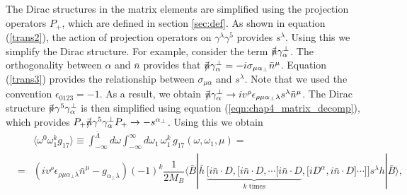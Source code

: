 The Dirac structures in the matrix elements are simplified using the projection operators $P_{+}$, which are defined in section \ref{sec:def}. As shown in equation (\ref{trans2}), the action of projection operators on $\gamma^{\lambda}\gamma^5$ provides $s^{\lambda}$. Using this we simplify the Dirac structure. For example, consider the term $\slashed{\bar{n}}\gamma_{\alpha}^{\perp}$. The orthogonality between $\alpha$ and $\bar{n}$ provides that $\nbslash\gamma_\alpha^\perp=-i\sigma_{\mu\alpha_\perp}\bar n^\mu$. Equation (\ref{trans3}) provides the relationship between $\sigma_{\mu\alpha}$ and $s^{\lambda}$. Note that we used the convention $\epsilon_{0123}=-1$. As a result, we obtain $\nbslash\gamma_\alpha^\perp\to iv^\rho\epsilon_{\rho\mu\alpha_\perp\lambda}s^\lambda\bar n^\mu$. The Dirac structure $\nbslash\gamma^5\gamma_\alpha^\perp$ is then simplified using equation (\ref{eqn:chap4_matrix_decomp}), which provides $P_+\nbslash\gamma^5\gamma_\alpha^\perp P_+\to-s^{\alpha_\perp}$. Using this we obtain
\begin{eqnarray}\label{eqn:chap5_mom_g17_omega_1}
&&\langle\omega^0\omega_1^kg_{17}\rangle\equiv\int^{\bar \Lambda}_{-\infty}d\omega\int^{\infty}_{-\infty}d\omega_1\,\omega_1^k \,g_{17}(\omega,\omega_1,\mu)=\nonumber\\
&=&\left(iv^\rho\epsilon_{\rho\mu\alpha_\perp\lambda}\bar n^\mu-g_{\alpha_\perp\lambda}\right)(-1)^k\dfrac{1}{2M_B}\langle\bar B| \bar h \,
    \underbrace{\big[i\bar n\cdot D,\big[i\bar n \cdot D,\cdots[i\bar n \cdot D}_\text{$k$ times},\big[iD^\alpha ,i\bar n \cdot D\big]\cdots\big]\big] s^\lambda h |\bar B\rangle,\nonumber\\
\end{eqnarray}

